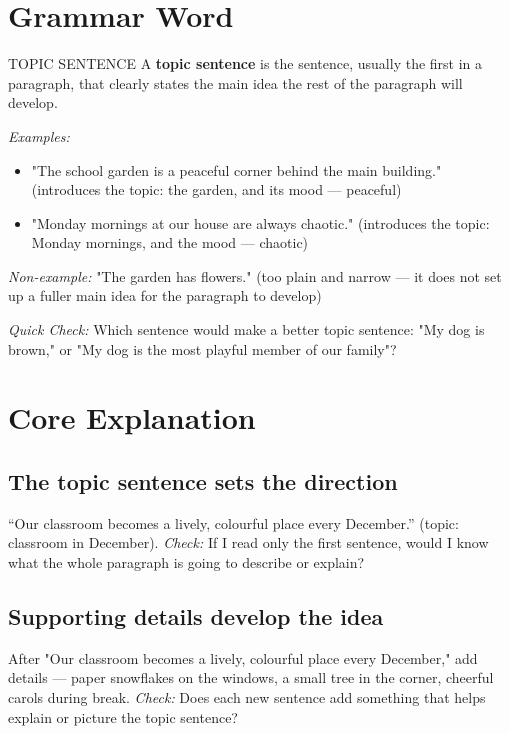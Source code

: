 \section{Grammar Word}
\begin{grammarword}{TOPIC SENTENCE}
A \textbf{topic sentence} is the sentence, usually the first in a paragraph, that clearly states the main idea the rest of the paragraph will develop.

\textit{Examples:}
\begin{itemize}
    \item "The school garden is a peaceful corner behind the main building." (introduces the topic: the garden, and its mood — peaceful)
    \item "Monday mornings at our house are always chaotic." (introduces the topic: Monday mornings, and the mood — chaotic)
\end{itemize}

\textit{Non-example:} "The garden has flowers." (too plain and narrow — it does not set up a fuller main idea for the paragraph to develop)

\textit{Quick Check:} Which sentence would make a better topic sentence: "My dog is brown," or "My dog is the most playful member of our family"?
\end{grammarword}

\section{Core Explanation}

\subsection*{The topic sentence sets the direction}
``Our classroom becomes a lively, colourful place every December.'' (topic: classroom in December). \textit{Check:} If I read only the first sentence, would I know what the whole paragraph is going to describe or explain?

\subsection*{Supporting details develop the idea}
After "Our classroom becomes a lively, colourful place every December," add details — paper snowflakes on the windows, a small tree in the corner, cheerful carols during break. \textit{Check:} Does each new sentence add something that helps explain or picture the topic sentence?

